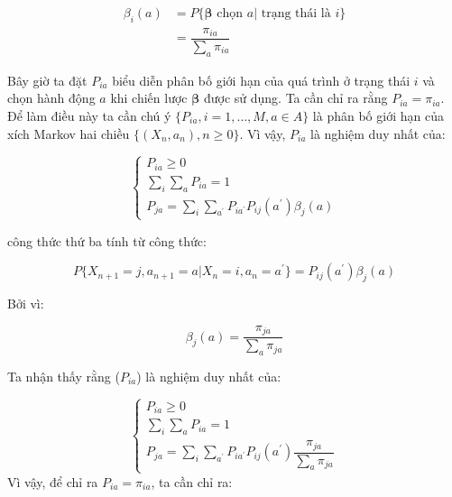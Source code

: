 \documentclass[14pt, a4paper]{article}
\numberwithin{equation}{section}
\numberwithin{figure}{section}
\theoremstyle{sltheorem}
\theoremstyle{soltheorem}
\numberwithin{dl}{section}
\numberwithin{md}{section}
\numberwithin{vd}{section}
\begin{document}
    \begin{equation*}
        \begin{aligned}
            \beta_i (a) &= P \lbrace \boldsymbol{\beta} \text{ chọn } a \vert \text{ trạng thái là } i \rbrace \\
            &= \dfrac{\pi_{ia}}{\sum_a \pi_{ia}}
        \end{aligned}
    \end{equation*}

    Bây giờ ta đặt $P_{ia}$ biểu diễn phân bố giới hạn của quá trình ở trạng thái $i$ và chọn hành động $a$ khi chiến lược $\boldsymbol{\beta}$ được sử dụng.
    Ta cần chỉ ra rằng $P_{ia}=\pi_{ia}$.
    Để làm điều này ta cần chú ý $\lbrace P_{ia}, i =1, \dots, M, a \in A \rbrace$ là phân bố giới hạn của xích Markov hai chiều $\lbrace (X_n, a_n), n \geq 0 \rbrace$.
    Vì vậy, $P_{ia}$ là nghiệm duy nhất của:

    \begin{equation*}
        \begin{cases}
            P_{ia} \geq 0 \\
            \sum_i \sum_a P_{ia} = 1 \\
            P_{ja} = \sum_i \sum_{a^{\prime}}P_{ia^{\prime}}P_{ij}(a^{\prime}) \beta_j(a)
        \end{cases}
    \end{equation*}

    công thức thứ ba tính từ công thức:

    \begin{equation*}
        P \lbrace X_{n+1} = j, a_{n+1}=a \vert X_n = i, a_n = a^{\prime} \rbrace = P_{ij}(a^{\prime}) \beta_j(a)
    \end{equation*}

    Bởi vì:

    \begin{equation*}
        \beta_j (a) = \dfrac{\pi_{ja}}{\sum_a \pi_{ja}}
    \end{equation*}

    Ta nhận thấy rằng ($P_{ia}$) là nghiệm duy nhất của:

    \begin{equation*}
        \begin{cases}
            P_{ia} \geq 0 \\
            \sum_i \sum_a P_{ia} = 1 \\
            P_{ja} = \sum_i \sum_{a^{\prime}} P_{ia^{\prime}} P_{ij}(a^{\prime}) \dfrac{\pi_{ja}}{\sum_a \pi_{ja}}
        \end{cases}
    \end{equation*}
    Vì vậy, để chỉ ra $P_{ia} = \pi_{ia}$, ta cần chỉ ra:
\end{document}
